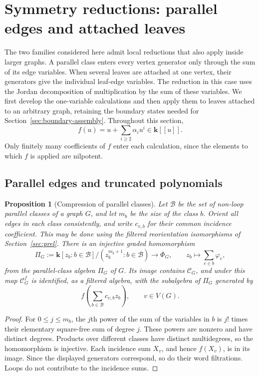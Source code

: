 \documentclass[reqno]{article}
\theoremstyle{plain} %
\newtheorem{proposition}[theorem]{Proposition}
\theoremstyle{definition}
\theoremstyle{remark}
\newcommand{\K} {\mathbf{k}}
\newcommand {\CC}{\mathscr{C}}
\numberwithin{equation}{section}
\begin{document}
\section{Symmetry reductions: parallel edges and attached leaves}
\label{sec:symmetry}

The two families considered here admit local reductions that also apply
inside larger graphs. A parallel class enters every vertex generator only
through the sum of its edge variables. When several leaves are attached
at one vertex, their generators give the individual leaf-edge variables.
The reduction in this case uses the Jordan decomposition of multiplication
by the sum of these variables. We first develop the one-variable
calculations and then apply them to leaves attached to an arbitrary graph,
retaining the boundary states needed for Section~\ref{sec:boundary-assembly}.
Throughout this section,
\begin{equation}\label{eq:polyn}
 f(u)=u+\sum_{i\ge2}\alpha_i u^i\in\K[[u]].
\end{equation}
Only finitely many coefficients of $f$ enter each calculation, since
the elements to which $f$ is applied are nilpotent.

\subsection{Parallel edges and truncated polynomials}
\label{sec:parallel}

\begin{proposition}[Compression of parallel classes]
\label{prop:parallel-compression}
Let $\mathcal B$ be the set of non-loop parallel classes of a graph $G$,
and let $m_b$ be the size of the class $b$. Orient all edges in each class
consistently, and write $c_{v,b}$ for their common incidence coefficient.
This may be done using the filtered reorientation isomorphisms of
Section~\ref{sec:prel}. There is an injective graded homomorphism
\begin{equation}\label{eq:parallel-compression}
 \Pi_G:=\K[z_b:b\in\mathcal B]/(z_b^{m_b+1}:b\in\mathcal B)
 \longrightarrow\Phi_G,\qquad
 z_b\longmapsto\sum_{e\in b}\varphi_e,
\end{equation}
from the \emph{parallel-class algebra} $\Pi_G$ of $G$. Its image contains
$\CC_G$, and under this map $\CC_G^f$ is identified,
as a filtered algebra, with the subalgebra of $\Pi_G$ generated by
\[
 f\left(\sum_{b\in\mathcal B}c_{v,b}z_b\right),\qquad v\in V(G).
\]
\end{proposition}
\begin{proof}
For $0\le j\le m_b$, the $j$th power of the sum of the variables in
$b$ is $j!$ times their elementary square-free sum of degree $j$.
These powers are nonzero and have distinct degrees. Products over
different classes have distinct multidegrees, so the homomorphism
is injective. Each incidence sum $X_v$, and hence $f(X_v)$, is in its
image. Since the displayed generators correspond, so do their word
filtrations. Loops do not contribute to the incidence sums.
\end{proof}
\end{document}

